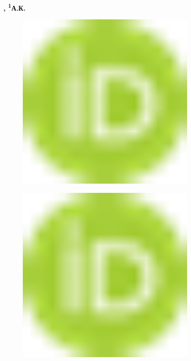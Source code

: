 {\bfseries , \textsuperscript{1}А.К.
\begin{figure}[H]
	\centering
	\includegraphics[width=0.8\textwidth]{media/ekon/image1}
	\caption*{}
\end{figure}

\begin{figure}[H]
	\centering
	\includegraphics[width=0.8\textwidth]{media/ekon/image1}
	\caption*{}
\end{figure}

}
